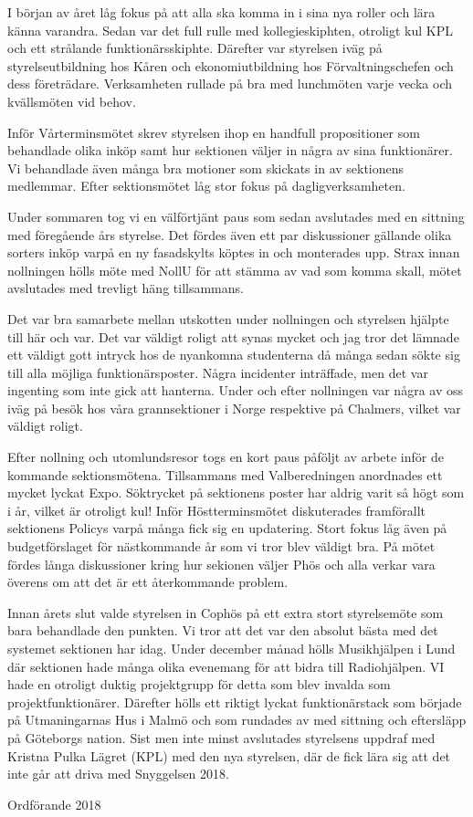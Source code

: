 \documentclass[../_main/handlingar.tex]{subfiles}
\begin{document}

I början av året låg fokus på att alla ska komma in i sina nya roller och lära känna
varandra. Sedan var det full rulle med kollegieskiphten, otroligt kul KPL och ett strålande funktionärsskiphte. Därefter var styrelsen iväg på styrelseutbildning hos Kåren och ekonomiutbildning hos Förvaltningschefen och dess företrädare. Verksamheten rullade på bra med lunchmöten varje vecka och kvällsmöten vid behov.

Inför Vårterminsmötet skrev styrelsen ihop en handfull propositioner som behandlade olika inköp samt hur sektionen väljer in några av sina funktionärer. Vi behandlade även många bra motioner som skickats in av sektionens medlemmar. Efter sektionsmötet låg stor fokus på dagligverksamheten.

Under sommaren tog vi en välförtjänt paus som sedan avslutades med en sittning med föregående års styrelse. Det fördes även ett par diskussioner gällande olika sorters inköp varpå en ny fasadskylts köptes in och monterades upp. Strax innan nollningen hölls möte med NollU för att stämma av vad som komma skall, mötet avslutades med trevligt häng tillsammans.

Det var bra samarbete mellan utskotten under nollningen och styrelsen hjälpte till här och var. Det var väldigt roligt att synas mycket och jag tror det lämnade ett väldigt gott intryck hos de nyankomna studenterna då många sedan sökte sig till alla möjliga funktionärsposter. Några incidenter inträffade, men det var ingenting som inte gick att hanterna. Under och efter nollningen var några av oss iväg på besök hos våra grannsektioner i Norge respektive på Chalmers, vilket var väldigt roligt.

Efter nollning och utomlundsresor togs en kort paus påföljt av arbete inför de kommande sektionsmötena. Tillsammans med Valberedningen anordnades ett mycket lyckat Expo. Söktrycket på sektionens poster har aldrig varit så högt som i år, vilket är otroligt kul! Inför Höstterminsmötet diskuterades framförallt sektionens Policys varpå många fick sig en updatering. Stort fokus låg även på budgetförslaget för nästkommande år som vi tror blev väldigt bra. På mötet fördes långa diskussioner kring hur sekionen väljer Phös och alla verkar vara överens om att det är ett återkommande problem.

Innan årets slut valde styrelsen in Cophös på ett extra stort styrelsemöte som bara behandlade den punkten. Vi tror att det var den absolut bästa med det systemet sektionen har idag. Under december månad hölls Musikhjälpen i Lund där sektionen hade många olika evenemang för att bidra till Radiohjälpen. VI hade en otroligt duktig projektgrupp för detta som blev invalda som projektfunktionärer. Därefter hölls ett riktigt lyckat funktionärstack som började på Utmaningarnas Hus i Malmö och som rundades av med sittning och eftersläpp på Göteborgs nation. Sist men inte minst avslutades styrelsens uppdraf med Kristna Pulka Lägret (KPL) med den nya styrelsen, där de fick lära sig att det inte går att driva med Snyggelsen 2018. 




\begin{signatures}{1}
    \mvh
    \signature{Daniel Bakic}{Ordförande 2018}
\end{signatures}
\end{document}

